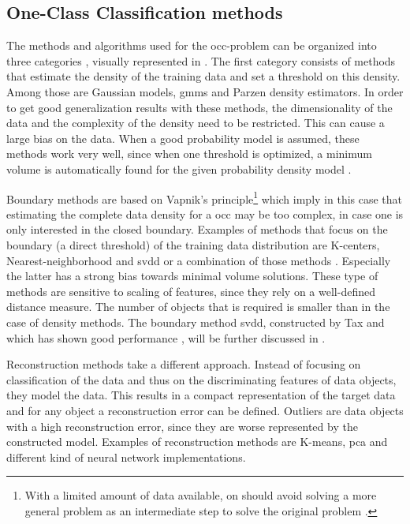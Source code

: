 \subsection{One-Class Classification methods}\label{subsec:occ-methods}
The methods and algorithms used for the \gls{occ}-problem can be organized into three categories \cite{tax2001one,noumir2012simple}, visually represented in .
The first category consists of methods that estimate the density of the training data and set a threshold on this density.
Among those are Gaussian models, \glspl{gmm} and Parzen density estimators.
In order to get good generalization results with these methods, the dimensionality of the data and the complexity of the density need to be restricted.
This can cause a large bias on the data.
When a good probability model is assumed, these methods work very well, since when one threshold is optimized, a minimum volume is automatically found for the given probability density model \cite{tax2001one}.

Boundary methods are based on Vapnik's principle\footnote{With a limited amount of data available, on should avoid solving a more general problem as an intermediate step to solve the original problem \cite{vapnik1998statistical}.} which imply in this case that estimating the complete data density for a \gls{occ} may be too complex, in case one is only interested in the closed boundary.
Examples of methods that focus on the boundary (a direct threshold) of the training data distribution are K-centers, Nearest-neighborhood and \gls{svdd} or a combination of those methods \cite{hempstalk2008one}.
Especially the latter has a strong bias towards minimal volume solutions.
These type of methods are sensitive to scaling of features, since they rely on a well-defined distance measure.
The number of objects that is required is smaller than in the case of density methods.
The boundary method \gls{svdd}, constructed by Tax and which has shown good performance \cite{khan2010survey}, will be further discussed in .

Reconstruction methods take a different approach.
Instead of focusing on classification of the data and thus on the discriminating features of data objects, they model the data.
This results in a compact representation of the target data and for any object a reconstruction error can be defined.
Outliers are data objects with a high reconstruction error, since they are worse represented by the constructed model.
Examples of reconstruction methods are K-means, \gls{pca} and different kind of neural network implementations.

